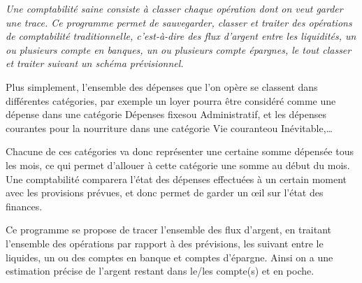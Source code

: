 {\it%
Une comptabilité saine consiste à classer chaque opération
dont on veut garder une trace. Ce programme permet de
sauvegarder, classer et traiter des opérations de comptabilité
traditionnelle, c'est-à-dire des flux d'argent entre les liquidités,
un ou plusieurs compte en banques, un ou plusieurs compte épargnes,
le tout classer et traiter suivant un schéma prévisionnel.

Plus simplement, l'ensemble des dépenses que l'on opère se
classent dans différentes catégories, par exemple un loyer pourra être considéré
comme une dépense dans une catégorie \og Dépenses fixes\fg ou 
\og Administratif\fg, et les dépenses courantes pour la nourriture dans
une catégorie \og Vie courante\fg ou \og Inévitable\fg,\dots

Chacune de ces catégories va donc représenter une certaine somme
dépensée tous les mois, ce qui permet d'allouer à cette catégorie
une somme au début du mois. Une comptabilité comparera l'état
des dépenses effectuées à un certain moment avec les provisions
prévues, et donc permet de garder un \oe il sur l'état des
finances.

Ce programme se propose de tracer l'ensemble des flux d'argent,
en traitant l'ensemble des opérations par rapport à des prévisions,
les suivant entre le liquides, un ou des comptes en banque et comptes
d'épargne. Ainsi on a une estimation précise de l'argent restant dans le/les
compte(s) et en poche.
}
